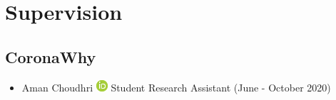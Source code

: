 \documentclass[10pt,a4paper,sans]{moderncv} %
\begin{document}
    \section{Supervision}
    \subsection{CoronaWhy}
        \begin{itemize}
        \item     Aman Choudhri {\scriptsize     \href{https://orcid.org/0000-0003-4963-6651}{\includegraphics[scale=0.5]{img/ORCIDiD_icon16x16}}
}    Student Research Assistant (June - October 2020)

        \end{itemize}
\end{document}

